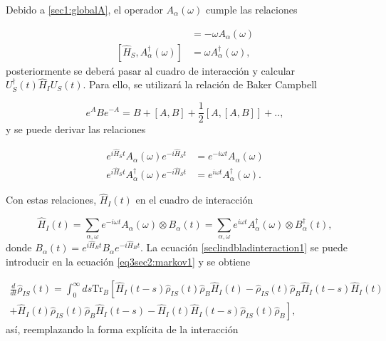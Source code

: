 Debido a \ref{sec1:globalA}, el operador $A_{\alpha}(\omega)$ cumple las relaciones

\begin{align*}
    [\hat{H}_{S},A_{\alpha}(\omega)] & = - \omega A_{\alpha}(\omega) \\
    [\hat{H}_{S},A^{\dagger}_{\alpha}(\omega)] & = \omega A^{\dagger}_{\alpha}(\omega),
\end{align*}
posteriormente se deberá pasar al cuadro de interacción y calcular $U^{\dagger}_{S}(t)\hat{H}_{I}U_{S}(t)$. Para ello, se utilizará la relación de Baker Campbell

\begin{equation}
    e^{A}Be^{-A} = B  + [A,B] + \frac{1}{2}[A,[A,B]] +..,
    \label{sec2lind:baker}
\end{equation}
y se puede derivar las relaciones 

\begin{align*}
    e^{i\hat{H}_{S}t}A_{\alpha}(\omega) e^{-i\hat{H}_{S}t} & = e^{-i\omega t} A_{\alpha}(\omega) \\
    e^{i\hat{H}_{S}t}A^{\dagger}_{\alpha}(\omega) e^{-i\hat{H}_{S}t} & = e^{i\omega t} A^{\dagger}_{\alpha}(\omega).
\end{align*}

Con estas relaciones, $\hat{H}_{I}(t)$ en el cuadro de interacción

\begin{equation}
    \hat{H}_{I}(t) = \sum_{\alpha,\omega}e^{-i\omega t}A_{\alpha}(\omega) \otimes B_{\alpha}(t) = \sum_{\alpha,\omega}e^{i\omega t}A^{\dagger}_{\alpha}(\omega) \otimes B^{\dagger}_{\alpha}(t),
    \label{seclindbladinteraction1}
\end{equation}
donde $B_{\alpha}(t) = e^{i\hat{H}_{B}t}B_{\alpha}e^{-i\hat{H}_{B}t}$. La ecuación \ref{seclindbladinteraction1} se puede introducir en la ecuación \ref{eq3sec2:markov1} y se obtiene 

\begin{align*}
    \frac{d}{dt}\hat{\rho}_{IS}(t) = \int_{0}^{\infty} ds \text{Tr}_{B}\left[  \hat{H}_{I}(t-s)\hat{\rho}_{IS}(t)\hat{\rho}_{B}\hat{H}_{I}(t) - \hat{\rho}_{IS}(t)\hat{\rho}_{B}\hat{H}_{I}(t-s)\hat{H}_{I}(t)    \right.\\
    \left. + \hat{H}_{I}(t)\hat{\rho}_{IS}(t)\hat{\rho}_{B}\hat{H}_{I}(t-s) -  \hat{H}_{I}(t)\hat{H}_{I}(t-s)\hat{\rho}_{IS}(t)\hat{\rho}_{B}  \right],
\end{align*}
así, reemplazando la forma explícita de la interacción  

